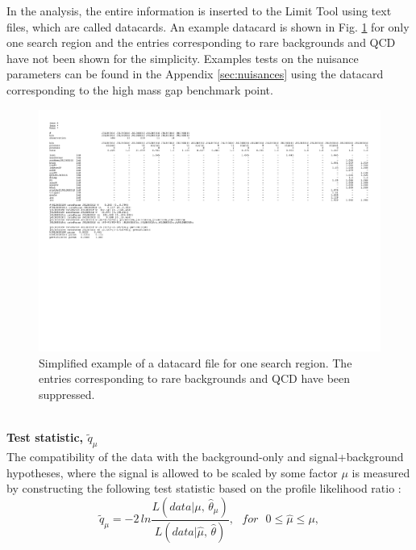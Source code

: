 In the analysis, the entire information is inserted to the Limit Tool using text files, which are called datacards. An example datacard is shown in Fig. \ref{fig:datacard} for only one search region and the entries corresponding to rare backgrounds and QCD have not been shown for the simplicity. Examples tests on the nuisance parameters can be found in the Appendix \ref{sec:nuisances} using the datacard corresponding to the high mass gap benchmark point.
\begin{figure}
\begin{center}
\includegraphics[width=\textwidth]{Plots/analysis/results/dataCardZeroB.pdf}
\caption{Simplified example of a datacard file for one search region. 
The entries corresponding to rare backgrounds and QCD have been suppressed.}\label{fig:datacard}
\end{center}
\end{figure}
\\
\textbf{Test statistic, $\tilde{q}_{\mu}$}\\
The compatibility of the data with the background-only and signal+background
hypotheses, where the signal is allowed to be scaled by some factor $\mu$ is measured by constructing the
following test statistic based on the profile likelihood ratio \cite{CLs3}:
\begin{equation}
{\tilde{q}_\mu} = {-2\,ln\frac{L(data|\mu,\, \hat{\theta}_{\mu})}{L(data|\hat{\mu},\, \hat{\theta})}}, \,\,\,\, for \,\,\,\, 0 \leq\hat{\mu}\leq\mu,
\end{equation}
